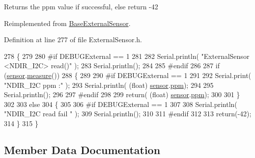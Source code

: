 \begin{DoxyReturn}{Returns}
the ppm value if successful, else return -\/42 
\end{DoxyReturn}


Reimplemented from \hyperlink{class_base_external_sensor_a1564f16deacf57b51b9948ac29db4291}{Base\+External\+Sensor}.



Definition at line 277 of file External\+Sensor.\+h.


\begin{DoxyCode}
278     \{
279         
280 \textcolor{preprocessor}{    #if DEBUGExternal == 1 }
281         
282         Serial.println( \textcolor{stringliteral}{"ExternalSensor <NDIR\_I2C> read()"} );
283         Serial.println();
284 
285 \textcolor{preprocessor}{    #endif}
286 
287         \textcolor{keywordflow}{if} (\hyperlink{class_external_sensor_3_01_n_d_i_r___i2_c_01_4_ae541c9cece7c38674b70114cdb74a7dc}{sensor}.\hyperlink{class_n_d_i_r___i2_c_ab8f50d38501d498b802b822bd4844ede}{measure}())
288         \{
289         
290 \textcolor{preprocessor}{        #if DEBUGExternal == 1 }
291 
292             Serial.print( \textcolor{stringliteral}{"NDIR\_I2C ppm :"} );
293             Serial.println( (\textcolor{keywordtype}{float}) \hyperlink{class_external_sensor_3_01_n_d_i_r___i2_c_01_4_ae541c9cece7c38674b70114cdb74a7dc}{sensor}.\hyperlink{class_n_d_i_r___i2_c_a7e5cfc725dba0f9c2bd1bd5ab3bb8600}{ppm});
294             
295             Serial.println();           
296 
297 \textcolor{preprocessor}{        #endif}
298 
299             \textcolor{keywordflow}{return}( (\textcolor{keywordtype}{float}) \hyperlink{class_external_sensor_3_01_n_d_i_r___i2_c_01_4_ae541c9cece7c38674b70114cdb74a7dc}{sensor}.\hyperlink{class_n_d_i_r___i2_c_a7e5cfc725dba0f9c2bd1bd5ab3bb8600}{ppm});
300             
301         \}
302         
303         \textcolor{keywordflow}{else}
304         \{
305         
306 \textcolor{preprocessor}{        #if DEBUGExternal == 1 }
307 
308             Serial.println( \textcolor{stringliteral}{"NDIR\_I2C read fail "} );
309             Serial.println();
310         
311 \textcolor{preprocessor}{        #endif}
312 
313             \textcolor{keywordflow}{return}(-42);
314         \}
315     \}
\end{DoxyCode}


\subsection{Member Data Documentation}
\mbox{\label{class_external_sensor_3_01_n_d_i_r___i2_c_01_4_ae541c9cece7c38674b70114cdb74a7dc}} 

